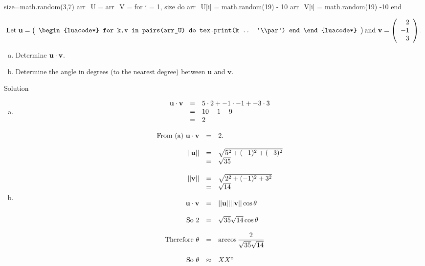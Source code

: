 \documentclass[12pt]{article}
\begin{document}
\begin{luacode*}
	size=math.random(3,7)
	arr_U = {}
	arr_V = {}
	for i = 1, size do
		arr_U[i] = math.random(19) - 10
		arr_V[i] = math.random(19) -10
	end
\end{luacode*}

\[\text{Let }\mathbf{u}= \left(\begin{array}{r}
\begin{luacode*}
	for k,v in pairs(arr_U) do 
		tex.print(k .. '\\par')
	end
\end{luacode*}
\end{array} \right) 
\text{and }\mathbf{v} =\left(\begin{array}{r} 2 \\ -1 \\ 3 \\ 
\end{array} \right).\]

\begin{enumerate}[(a)]
	\item		Determine ${\bf u} \cdot {\bf v}$.
	\item 	Determine the angle in degrees (to the nearest degree) between $ \mathbf {u} $ and $ \mathbf{v}$.
\end{enumerate}

\vspace*{5mm}

Solution

\begin{enumerate}[(a)]
	\item 	\[\begin{array}{rcl}
			{\bf u} \cdot {\bf v} 		& = & 	5 \cdot 2 + -1 \cdot -1 + -3\cdot3	\\
								& = &	10+1-9		\\
								& = & 	2
			\end{array}\]
			
	\item 	\[\begin{array}{rcl}
			\text{From (a) } {\bf u} \cdot {\bf v}  	& = & 	2. 	\\
												\\
		 	||{\bf u}|| 	& = & 	\sqrt{5^2+(-1)^2+(-3)^2} 	\\
 					& = & 	\sqrt{35}				\\
												\\
  			||{\bf v}|| 	& = & 	\sqrt{2^2+(-1)^2+3^2}	\\
  					& = & 	\sqrt{14}				\\
												\\
  			{\bf u} \cdot {\bf v} 		& = & 	||{\bf u}||||{\bf v}||\cos\theta 	\\
												\\
 		 	\text{So } 2 			& = & 	\sqrt{35}\sqrt{14}\cos\theta	\\
												\\
 			\text{Therefore } \theta 	& = & 	\arccos\dfrac{2}{\sqrt{35}\sqrt{14}}	\\
												\\
 			\text{So }  \theta 		& \approx & 	XX ^{\circ}
			\end{array}\]
\end{enumerate}
\end{document}

